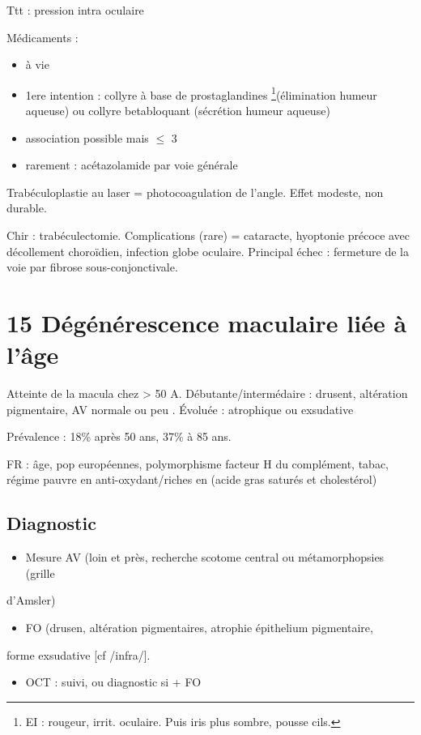 \documentclass[11pt]{article}
\begin{document}
Ttt : \dec pression intra oculaire

Médicaments :
\begin{itemize}
\item à vie
\item 1ere intention : collyre à base de prostaglandines \footnote{EI : rougeur, irrit. oculaire. Puis iris plus sombre, \inc pousse cils.}(\inc élimination humeur
aqueuse) ou collyre betabloquant
(\dec sécrétion humeur aqueuse)
\item association possible mais \(\le\) 3
\item rarement : acétazolamide par voie générale
\end{itemize}

Trabéculoplastie au laser = photocoagulation de l'angle. Effet modeste, non durable.

Chir : trabéculectomie. Complications (rare) = cataracte, hyoptonie précoce
avec décollement choroïdien, infection globe oculaire. Principal échec :
fermeture de la voie par fibrose sous-conjonctivale.

\section{15 Dégénérescence maculaire liée à l'âge}
\label{sec:org6625cf6}
Atteinte de la macula chez > 50 A. Débutante/intermédaire : drusent, altération
pigmentaire, AV normale ou peu \dec. Évoluée : atrophique ou exsudative

Prévalence : 18\% après 50 ans, 37\% à 85 ans.

FR : âge, pop européennes, polymorphisme facteur H du complément, tabac, régime
pauvre en anti-oxydant/riches en (acide gras saturés et cholestérol)

\subsection{Diagnostic}
\label{sec:orgd46032e}
\begin{itemize}
\item Mesure AV (loin et près, recherche scotome central ou métamorphopsies (grille
\end{itemize}
d'Amsler)
\begin{itemize}
\item FO (drusen, altération pigmentaires, atrophie épithelium pigmentaire,
\end{itemize}
forme exsudative [cf /infra/].
\begin{itemize}
\item OCT : suivi, ou diagnostic si + FO
\end{itemize}
\end{document}
